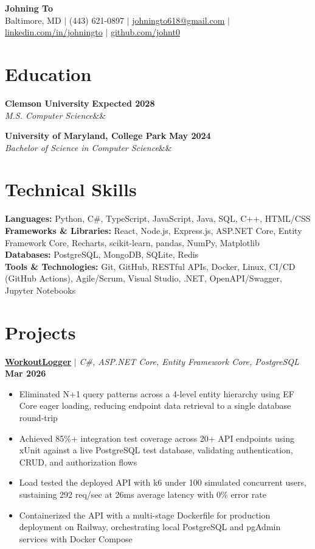 \documentclass[11pt,letterpaper]{article}
\makeatletter
\newcommand{\name}{Johning To}
\newcommand{\phone}{(443) 621-0897}
\newcommand{\email}{johningto618@gmail.com}
\newcommand{\linkedin}{linkedin.com/in/johningto}
\newcommand{\github}{github.com/johnt0}
\newcommand{\location}{Baltimore, MD}
\newcommand{\languages}{Python, C\#, TypeScript, JavaScript, Java, SQL, C++, HTML/CSS}
\newcommand{\frameworks}{React, Node.js, Express.js, ASP.NET Core, Entity Framework Core, Recharts, scikit-learn, pandas, NumPy, Matplotlib}
\newcommand{\databases}{PostgreSQL, MongoDB, SQLite, Redis}
\newcommand{\toolstech}{Git, GitHub, RESTful APIs, Docker, Linux, CI/CD (GitHub Actions), Agile/Scrum, Visual Studio, .NET, OpenAPI/Swagger, Jupyter Notebooks}
\newcommand{\education}[4]{%
    \noindent\textbf{#1} \hfill \textbf{#2}\\
    \textit{#3}\ifx&#4&\else\hfill #4\fi\par
}
\newcommand{\project}[3]{
    \noindent\textbf{#1} $\mid$ \textit{#2} \hfill \textbf{#3}
}
\makeatother
\begin{document}
\begin{center}
    {\Huge \textbf{\name}}\\
    \location{} $\mid$ \phone{} $\mid$
    \href{mailto:\email}{\email} $\mid$
    \href{https://\linkedin}{\linkedin} $\mid$
    \href{https://\github}{\github}
\end{center}

\section{Education}
\education{Clemson University}{Expected 2028}{M.S. Computer Science}{}
\vspace{1pt}
\education{University of Maryland, College Park}{May 2024}{Bachelor of Science in Computer Science}{}

\section{Technical Skills}
\textbf{Languages:} \languages\\
\textbf{Frameworks \& Libraries:} \frameworks\\
\textbf{Databases:} \databases\\
\textbf{Tools \& Technologies:} \toolstech

\section{Projects}

\project{\href{https://github.com/johnt0/WorkoutLogger}{WorkoutLogger}}{C\#, ASP.NET Core, Entity Framework Core, PostgreSQL}{Mar 2026}
\begin{itemize}
    \item Eliminated N+1 query patterns across a 4-level entity hierarchy using EF Core eager loading,
    reducing endpoint data retrieval to a single database round-trip
    \item Achieved 85\%+ integration test coverage across 20+ API endpoints using
    xUnit against a live PostgreSQL test database, validating authentication, CRUD,
    and authorization flows
    \item Load tested the deployed API with k6 under 100 simulated concurrent users,
    sustaining 292 req/sec at 26ms average latency with 0\% error rate
    \item Containerized the API with a multi-stage Dockerfile for production deployment on Railway,
    orchestrating local PostgreSQL and pgAdmin services with Docker Compose
\end{itemize}
\end{document}
